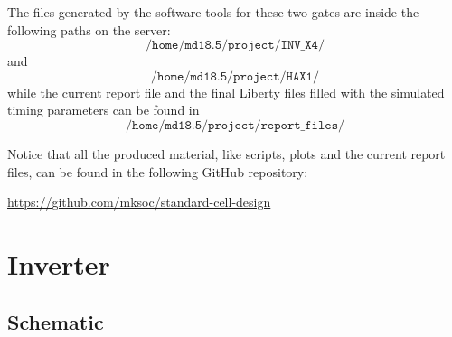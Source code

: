 \documentclass[a4paper]{article}
\begin{document}
The files generated by the software tools for these two gates are inside the following paths on the server:
\begin{equation*}
	\texttt{/home/md18.5/project/INV\_X4/}
\end{equation*}
and
\begin{equation*}
	\texttt{/home/md18.5/project/HAX1/}
\end{equation*}
while the current report file and the final Liberty files filled with the simulated timing parameters can be found in
\begin{equation*}
	\texttt{/home/md18.5/project/report\_files/}
\end{equation*}

Notice that all the produced material, like scripts, plots and the current report files, can be found in the following GitHub repository:
\begin{center}
	\url{https://github.com/mksoc/standard-cell-design}
\end{center}

\section{Inverter}

\subsection{Schematic}
\end{document}
